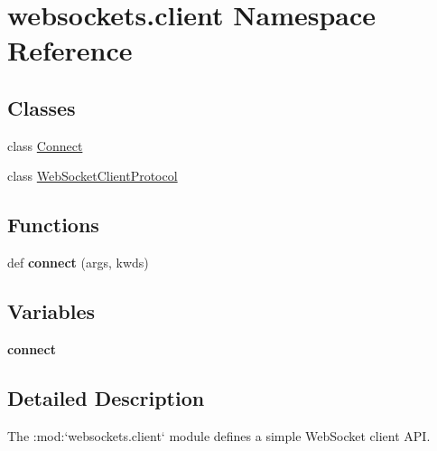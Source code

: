 \hypertarget{namespacewebsockets_1_1client}{}\section{websockets.\+client Namespace Reference}
\label{namespacewebsockets_1_1client}
\subsection*{Classes}
\begin{DoxyCompactItemize}
\item 
class \hyperlink{classwebsockets_1_1client_1_1_connect}{Connect}
\item 
class \hyperlink{classwebsockets_1_1client_1_1_web_socket_client_protocol}{Web\+Socket\+Client\+Protocol}
\end{DoxyCompactItemize}
\subsection*{Functions}
\begin{DoxyCompactItemize}
\item 
\mbox{\label{namespacewebsockets_1_1client_ae6f2dcca15f564106fee16e1e9b2e02f}} 
def {\bfseries connect} (args, kwds)
\end{DoxyCompactItemize}
\subsection*{Variables}
\begin{DoxyCompactItemize}
\item 
\mbox{\label{namespacewebsockets_1_1client_ac1e55c934195c17eecade33a4a9520a3}} 
{\bfseries connect}
\end{DoxyCompactItemize}


\subsection{Detailed Description}
\begin{DoxyVerb}The :mod:`websockets.client` module defines a simple WebSocket client API.\end{DoxyVerb}
 